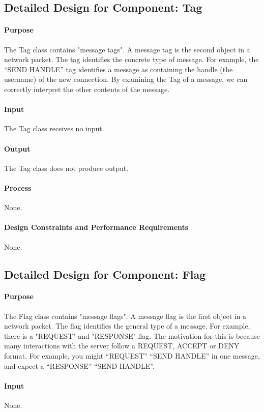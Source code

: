 \documentclass[12pt,a4paper]{article}
\begin{document}
\subsection{Detailed Design for Component: Tag }
\paragraph{Purpose} The Tag class contains "message tags". A message tag is the second object in a network packet. The tag identifies the concrete type of message. For example, the ``SEND HANDLE'' tag identifies a message as containing the handle (the username) of the new connection. By examining the Tag of a message, we can correctly interpret the other contents of the message. 
\paragraph{Input} The Tag class receives no input. 
\paragraph{Output} The Tag class does not produce output. 
\paragraph{Process} None. 
\paragraph{Design Constraints and Performance Requirements} None.

\subsection{Detailed Design for Component: Flag }
\paragraph{Purpose} The Flag class contains "message flags". A message flag is the first object in a network packet. The flag identifies the general type of a message. For example, there is a "REQUEST" and "RESPONSE" flag. The motivation for this is because many interactions with the server follow a REQUEST, ACCEPT or DENY format. For example, you might ``REQUEST'' ``SEND HANDLE'' in one message, and expect a ``RESPONSE'' ``SEND HANDLE''.
\paragraph{Input} None.
\end{document}
